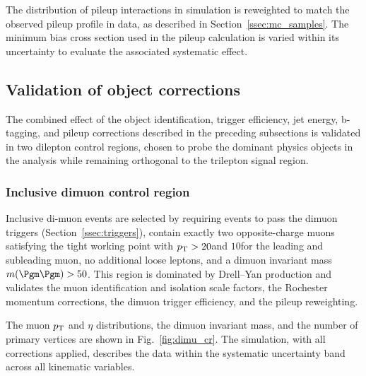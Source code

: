 The distribution of pileup interactions in simulation is reweighted to match the observed pileup profile in data, as described in Section~\ref{ssec:mc_samples}. The minimum bias cross section used in the pileup calculation is varied within its uncertainty to evaluate the associated systematic effect.

\subsection{Validation of object corrections}
\label{ssec:validation}

The combined effect of the object identification, trigger efficiency, jet energy, b-tagging, and pileup corrections described in the preceding subsections is validated in two dilepton control regions, chosen to probe the dominant physics objects in the analysis while remaining orthogonal to the trilepton signal region.

\subsubsection*{Inclusive dimuon control region}

Inclusive di-muon events are selected by requiring events to pass the dimuon triggers (Section~\ref{ssec:triggers}), contain exactly two opposite-charge muons satisfying the tight working point with $p_{\mathrm{T}} > 20$\GeV and $10$\GeV for the leading and subleading muon, no additional loose leptons, and a dimuon invariant mass $m(\Pgm\Pgm) > 50$\GeV. This region is dominated by Drell--Yan production and validates the muon identification and isolation scale factors, the Rochester momentum corrections, the dimuon trigger efficiency, and the pileup reweighting.

The muon $p_{\mathrm{T}}$ and $\eta$ distributions, the dimuon invariant mass, and the number of primary vertices are shown in Fig.~\ref{fig:dimu_cr}. The simulation, with all corrections applied, describes the data within the systematic uncertainty band across all kinematic variables.

